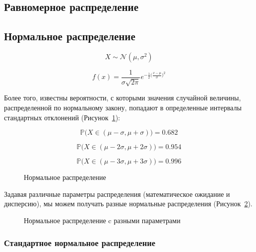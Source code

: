 \documentclass[
  letterpaper,
  DIV=11,
  numbers=noendperiod]{scrreprt}
\theoremstyle{definition}
\theoremstyle{remark}
\begin{document}
\subsection{Равномерное распределение}\label{stats-rand-values-uniform}

\subsection{Нормальное распределение}\label{stats-rand-values-norm}

\[
X \sim \mathcal{N}(\mu, \sigma^2)
\]

\[
f(x) = \frac{1}{\sigma \sqrt{2\pi}}e^{-\frac{1}{2}\big(\frac{x - \mu}{\sigma}\big)^2}
\]

Более того, известны вероятности, с которыми значения случайной
величины, распределенной по нормальному закону, попадают в определенные
интервалы стандартных отклонений (Рисунок~\ref{fig-norm}):

\[
\mathbb{P}\big( X \in (\mu\!-\!\sigma, \mu\!+\!\sigma) \big) = 0.682
\]

\[
\mathbb{P}\big( X \in (\mu\!-\!2\sigma, \mu\!+\!2\sigma) \big) = 0.954
\]

\[
\mathbb{P}\big( X \in (\mu\!-\!3\sigma, \mu\!+\!3\sigma) \big) = 0.996
\]

\begin{figure}


\caption{\label{fig-norm}Нормальное распределение}

\end{figure}%

Задавая различные параметры распределения (математическое ожидание и
дисперсию), мы можем получать разные нормальные распределения
(Рисунок~\ref{fig-norms}).

\begin{figure}


\caption{\label{fig-norms}Нормальное распределение c разными
параметрами}

\end{figure}%

\subsubsection{Стандартное нормальное
распределение}\label{stats-rand-values-stnorm}
\end{document}
